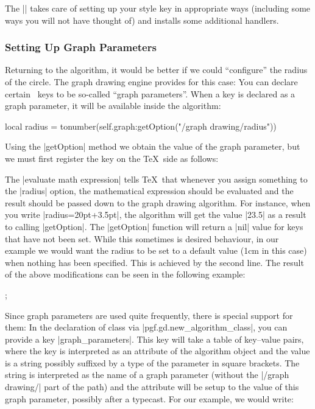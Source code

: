 The |\pgfgddeclarealgorithmkey| takes care of setting up your style
key in appropriate ways (including some ways you will not have thought
of) and installs some additional handlers.


\subsubsection{Setting Up Graph Parameters}

Returning to the algorithm, it would be better if we could
``configure'' the radius of the circle. The graph drawing engine
provides for this case: You can declare certain \pgfname\ keys to be
so-called ``graph parameters''. When a key is declared as a graph
parameter, it will be available inside the algorithm: 

\begin{codeexample}
local radius = tonumber(self.graph:getOption("/graph drawing/radius"))
\end{codeexample}

Using the |getOption| method we obtain the value of the
graph parameter, but we must first register the key on the \TeX\ side
as follows: 

\begin{codeexample}
\end{codeexample}

The |evaluate math expression| tells \TeX\ that whenever you assign
something to the |radius| option, the mathematical expression should
be evaluated and the result should be passed down to the graph drawing
algorithm. For instance, when you write |radius=20pt+3.5pt|, the
algorithm will get the value |23.5| as a result to calling
|getOption|. The |getOption| function will return a |nil| value for
keys that have not been set. While this sometimes is desired
behaviour, in our example we would want the radius to be set to a
default value (1cm in this case) when nothing has been specified. This
is achieved by the second line. The result of the above modifications
can be seen in the following example:

\begin{codeexample}[]
\tikz {};
\end{codeexample}

Since graph parameters are used quite frequently, there is special
support for them: In the declaration of class via
|pgf.gd.new_algorithm_class|, you can provide a key
|graph_parameters|. This key will take a table of key--value pairs,
where the key is interpreted as an attribute of the algorithm object
and the value is a string possibly suffixed by a type of the parameter
in square brackets. The string is interpreted as the name of a graph
parameter (without the |/graph drawing/| part of the path) and the
attribute will be setup to the value of this graph parameter, possibly
after a typecast. For our example, we would write:

